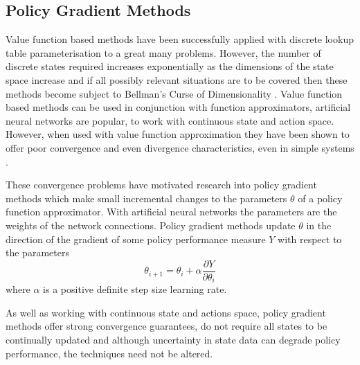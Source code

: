 \subsection{Policy Gradient Methods}
\label{sec:policygradient}
%
Value function based methods have been successfully applied with discrete lookup
table parameterisation to a great many problems.  However, the number of
discrete states required increases exponentially as the dimensions of the state space
increase and if all possibly relevant situations are to be covered then these
methods become subject to Bellman's Curse of Dimensionality
\cite{bellman:1961}.  Value function based methods can be used in conjunction
with function approximators, artificial neural networks are popular, to work
with continuous state and action space.  However, when used with value
function approximation they have been shown to offer poor convergence and even
divergence characteristics, even in simple systems \cite{peters:enac}.

These convergence problems have motivated research into policy gradient methods
which make small incremental changes to the parameters $\theta$ of a policy
function approximator.  With artificial neural networks the parameters are
the weights of the network connections.  Policy gradient methods update
$\theta$ in the direction of the gradient of some policy performance measure
$Y$ with respect to the parameters
\begin{equation}
\theta_{i+1} = \theta_i + \alpha \frac{\partial Y}{\partial \theta_i}
\end{equation}
where $\alpha$ is a positive definite step size learning rate.

As well as working with continuous state and actions space, policy gradient
methods offer strong convergence guarantees, do not require all states to be
continually updated and although uncertainty in state data can degrade policy
performance, the techniques need not be altered.


